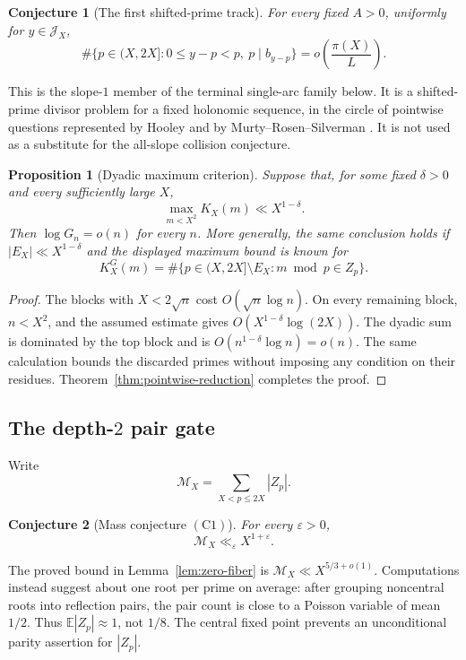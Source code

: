 \documentclass[11pt]{amsart}
\theoremstyle{plain}
\newtheorem{proposition}{Proposition}
\newtheorem{conjecture}{Conjecture}
\theoremstyle{remark}
\begin{document}
\begin{conjecture}[The first shifted-prime track]
\label{conj:shifted-prime-divisor}
For every fixed $A>0$, uniformly for $y\in\mathcal J_X$,
\[
 \#\{p\in(X,2X]:0\leq y-p<p,\ p\mid b_{y-p}\}
 =o\left(\frac{\pi(X)}{L}\right).
\]
\end{conjecture}

This is the slope-$1$ member of the terminal single-arc family below.
It is a shifted-prime divisor problem for a fixed holonomic sequence,
in the circle of pointwise questions represented by Hooley and by
Murty--Rosen--Silverman \cite{Hooley1973,MurtyRosenSilverman1996}.
It is not used as a substitute for the all-slope collision conjecture.

\begin{proposition}[Dyadic maximum criterion]\label{prop:dyadic-max}
Suppose that, for some fixed $\delta>0$ and every sufficiently large
$X$,
\[
 \max_{m<X^2}K_X(m)\ll X^{1-\delta}.
\]
Then $\log G_n=o(n)$ for every $n$.
More generally, the same conclusion holds if
$|E_X|\ll X^{1-\delta}$ and the displayed maximum bound is known for
\[
 K_X^{G}(m)
 =\#\{p\in(X,2X]\setminus E_X:m\bmod p\in Z_p\}.
\]
\end{proposition}

\begin{proof}
The blocks with $X<2\sqrt n$ cost $O(\sqrt n\log n)$.  On every
remaining block, $n<X^2$, and the assumed estimate gives
$O(X^{1-\delta}\log(2X))$.  The dyadic sum is dominated by the top
block and is $O(n^{1-\delta}\log n)=o(n)$.  The same calculation bounds
the discarded primes without imposing any condition on their residues.
Theorem~\ref{thm:pointwise-reduction} completes the proof.
\end{proof}

\subsection{The depth-$2$ pair gate}

Write
\[
 \mathcal M_X=\sum_{X<p\leq2X}|Z_p|.
\]

\begin{conjecture}[Mass conjecture $(\mathrm C1)$]\label{conj:C1}
For every $\varepsilon>0$,
\[
 \mathcal M_X\ll_{\varepsilon}X^{1+\varepsilon}.
 \tag{C1}\label{eq:C1}
\]
\end{conjecture}

The proved bound in Lemma~\ref{lem:zero-fiber} is
$\mathcal M_X\ll X^{5/3+o(1)}$.  Computations instead suggest about one
root per prime on average: after grouping noncentral roots into
reflection pairs, the pair count is close to a Poisson variable of mean
$1/2$.  Thus $\mathbb E|Z_p|\approx1$, not $1/8$.  The central fixed
point prevents an unconditional parity assertion for $|Z_p|$.
\end{document}
